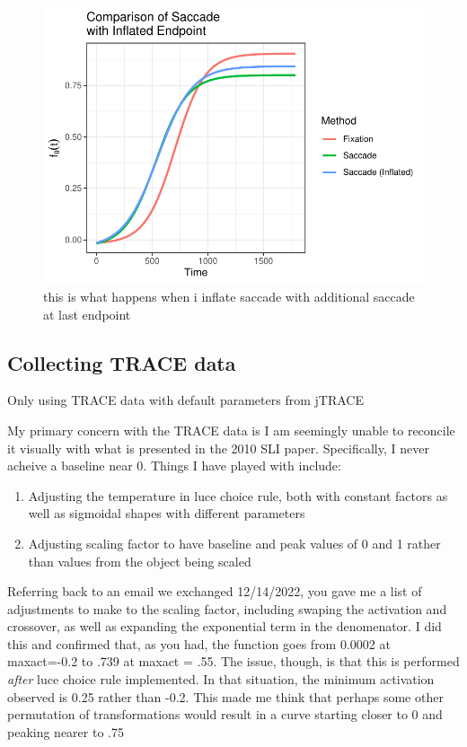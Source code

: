 \documentclass{article}
\begin{document}
\begin{figure}
\centering
\includegraphics{sac_inflate_compare.pdf}
\caption{this is what happens when i inflate saccade with additional saccade at last endpoint}
\label{fig:saccade_inflate}
\end{figure}

\subsection{Collecting TRACE data}

Only using TRACE data with default parameters from jTRACE

My primary concern with the TRACE data is I am seemingly unable to reconcile it visually with what is presented in the 2010 SLI paper. Specifically, I never acheive a baseline near 0. Things I have played with include:

\begin{singlespace}
\begin{enumerate}
\vspace{-3mm}
\item Adjusting the temperature in luce choice rule, both with constant factors as well as sigmoidal shapes with different parameters
\item Adjusting scaling factor to have baseline and peak values of 0 and 1 rather than values from the object being scaled
\end{enumerate}
\end{singlespace}

Referring back to an email we exchanged 12/14/2022, you gave me a list of adjustments to make to the scaling factor, including swaping the activation and crossover, as well as expanding the exponential term in the denomenator. I did this and confirmed that, as you had, the function goes from 0.0002 at maxact=-0.2 to .739 at maxact = .55. The issue, though, is that this is performed \textit{after} luce choice rule implemented. In that situation, the minimum activation observed is 0.25 rather than -0.2. This made me think that perhaps some other permutation of transformations would result in a curve starting closer to 0 and peaking nearer to .75
\end{document}
